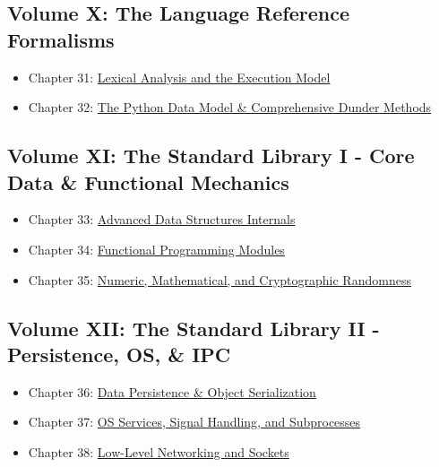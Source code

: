 \hypertarget{volume-x-the-language-reference-formalisms}{%
\subsection{Volume X: The Language Reference
Formalisms}\label{volume-x-the-language-reference-formalisms}}

\begin{itemize}
\tightlist
\item
  Chapter 31:
  \protect\hyperlink{chapter-31-lexical-analysis-and-the-execution-model}{Lexical
  Analysis and the Execution Model}
\item
  Chapter 32:
  \protect\hyperlink{chapter-32-the-python-data-model--comprehensive-dunder-methods}{The
  Python Data Model \& Comprehensive Dunder Methods}
\end{itemize}

\hypertarget{volume-xi-the-standard-library-i---core-data-functional-mechanics}{%
\subsection{Volume XI: The Standard Library I - Core Data \& Functional
Mechanics}\label{volume-xi-the-standard-library-i---core-data-functional-mechanics}}

\begin{itemize}
\tightlist
\item
  Chapter 33:
  \protect\hyperlink{chapter-33-advanced-data-structures-internals}{Advanced
  Data Structures Internals}
\item
  Chapter 34:
  \protect\hyperlink{chapter-34-functional-programming-modules}{Functional
  Programming Modules}
\item
  Chapter 35:
  \protect\hyperlink{chapter-35-numeric-mathematical-and-cryptographic-randomness}{Numeric,
  Mathematical, and Cryptographic Randomness}
\end{itemize}

\hypertarget{volume-xii-the-standard-library-ii---persistence-os-ipc}{%
\subsection{Volume XII: The Standard Library II - Persistence, OS, \&
IPC}\label{volume-xii-the-standard-library-ii---persistence-os-ipc}}

\begin{itemize}
\tightlist
\item
  Chapter 36:
  \protect\hyperlink{chapter-36-data-persistence--object-serialization}{Data
  Persistence \& Object Serialization}
\item
  Chapter 37:
  \protect\hyperlink{chapter-37-os-services-signal-handling-and-subprocesses}{OS
  Services, Signal Handling, and Subprocesses}
\item
  Chapter 38:
  \protect\hyperlink{chapter-38-low-level-networking-and-sockets}{Low-Level
  Networking and Sockets}
\end{itemize}


